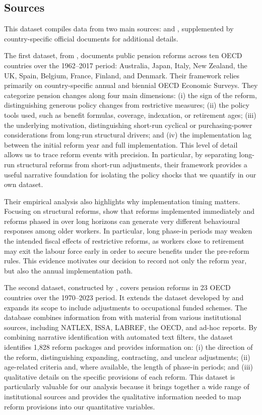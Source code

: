 \documentclass[11pt,english,a4paper, twoside, authoryear]{article}
\begin{document}
\subsection{Sources}

This dataset compiles data from two main sources: \citet{BiZubairy2023} and \citet{romp_political_2024}, supplemented by country-specific official documents for additional details.

The first dataset, from \citet{BiZubairy2023}, documents public pension reforms across ten OECD countries over the 1962--2017 period: Australia, Japan, Italy, New Zealand, the UK, Spain, Belgium, France, Finland, and Denmark. Their framework relies primarily on country-specific annual and biennial OECD Economic Surveys. They categorize pension changes along four main dimensions: (i) the sign of the reform, distinguishing generous policy changes from restrictive measures; (ii) the policy tools used, such as benefit formulas, coverage, indexation, or retirement ages; (iii) the underlying motivation, distinguishing short-run cyclical or purchasing-power considerations from long-run structural drivers; and (iv) the implementation lag between the initial reform year and full implementation. This level of detail allows us to trace reform events with precision. In particular, by separating long-run structural reforms from short-run adjustments, their framework provides a useful narrative foundation for isolating the policy shocks that we quantify in our own dataset.

Their empirical analysis also highlights why implementation timing matters. Focusing on structural reforms, \citet{BiZubairy2023} show that reforms implemented immediately and reforms phased in over long horizons can generate very different behavioural responses among older workers. In particular, long phase-in periods may weaken the intended fiscal effects of restrictive reforms, as workers close to retirement may exit the labour force early in order to secure benefits under the pre-reform rules. This evidence motivates our decision to record not only the reform year, but also the annual implementation path.


The second dataset, constructed by \citet{romp_political_2024}, covers pension reforms in 23 OECD countries over the 1970--2023 period. It extends the dataset developed by \citet{Beetsma2020} and expands its scope to include adjustments to occupational funded schemes. The database combines information from \citet{BiZubairy2023} with material from various institutional sources, including NATLEX, ISSA, LABREF, the OECD, and ad-hoc reports. By combining narrative identification with automated text filters, the dataset identifies 1,828 reform packages and provides information on: (i) the direction of the reform, distinguishing expanding, contracting, and unclear adjustments; (ii) age-related criteria and, where available, the length of phase-in periods; and (iii) qualitative details on the specific provisions of each reform. This dataset is particularly valuable for our analysis because it brings together a wide range of institutional sources and provides the qualitative information needed to map reform provisions into our quantitative variables.
\end{document}
